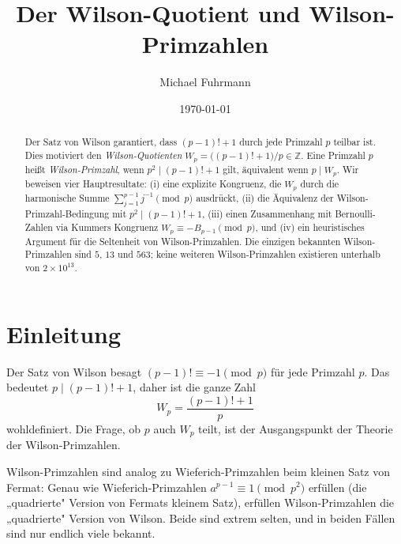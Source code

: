 \documentclass[12pt,a4paper]{amsart}
\theoremstyle{definition}
\newcommand{\Z}{\mathbb{Z}}
\begin{document}

\title{Der Wilson-Quotient und Wilson-Primzahlen}

\author{Michael Fuhrmann}
\address{Specialist-Mathematics-Projekt, Build 64}
\date{\today}

\begin{abstract}
Der Satz von Wilson garantiert, dass $(p-1)! + 1$ durch jede Primzahl $p$
teilbar ist. Dies motiviert den \emph{Wilson-Quotienten}
$W_p = \bigl((p-1)!+1\bigr)/p \in \Z$.
Eine Primzahl $p$ heißt \emph{Wilson-Primzahl}, wenn $p^2 \mid (p-1)!+1$ gilt,
äquivalent wenn $p \mid W_p$. Wir beweisen vier Hauptresultate:
(i) eine explizite Kongruenz, die $W_p$ durch die harmonische Summe
$\sum_{j=1}^{p-1} j^{-1} \pmod{p}$ ausdrückt,
(ii) die Äquivalenz der Wilson-Primzahl-Bedingung mit $p^2 \mid (p-1)!+1$,
(iii) einen Zusammenhang mit Bernoulli-Zahlen via Kummers Kongruenz
$W_p \equiv -B_{p-1} \pmod{p}$,
und (iv) ein heuristisches Argument für die Seltenheit von Wilson-Primzahlen.
Die einzigen bekannten Wilson-Primzahlen sind $5$, $13$ und $563$;
keine weiteren Wilson-Primzahlen existieren unterhalb von $2 \times 10^{13}$.
\end{abstract}

\maketitle
\tableofcontents

\section{Einleitung}

Der Satz von Wilson besagt $(p-1)! \equiv -1 \pmod{p}$ für jede Primzahl $p$.
Das bedeutet $p \mid (p-1)! + 1$, daher ist die ganze Zahl
\[
  W_p = \frac{(p-1)! + 1}{p}
\]
wohldefiniert. Die Frage, ob $p$ auch $W_p$ teilt, ist der Ausgangspunkt
der Theorie der Wilson-Primzahlen.

Wilson-Primzahlen sind analog zu Wieferich-Primzahlen beim kleinen Satz von
Fermat: Genau wie Wieferich-Primzahlen $a^{p-1} \equiv 1 \pmod{p^2}$ erfüllen
(die „quadrierte" Version von Fermats kleinem Satz), erfüllen Wilson-Primzahlen
die „quadrierte" Version von Wilson. Beide sind extrem selten, und in beiden
Fällen sind nur endlich viele bekannt.
\end{document}
